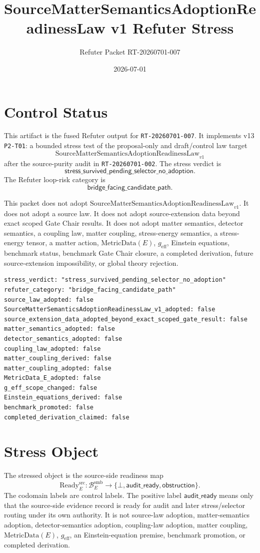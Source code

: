 \documentclass[11pt]{article}
\title{SourceMatterSemanticsAdoptionReadinessLaw v1 Refuter Stress}
\author{Refuter Packet RT-20260701-007}
\date{2026-07-01}
\newcommand{\SMSAR}{\mathrm{SourceMatterSemanticsAdoptionReadinessLaw}_{v1}}
\newcommand{\BridgeDom}{\mathcal B^{\mathrm{smb}}_E}
\newcommand{\Ready}{\mathrm{Ready}^{\mathrm{src}}_E}
\newcommand{\AuditReady}{\mathsf{audit\_ready}}
\newcommand{\Obstruction}{\mathsf{obstruction}}
\newcommand{\Bottom}{\bot}
\newcommand{\MetricData}{\mathrm{MetricData}}
\newcommand{\geff}{g_{\mathrm{eff}}}
\newcommand{\StressVerdict}{\mathsf{stress\_survived\_pending\_selector\_no\_adoption}}
\begin{document}
\maketitle

\section{Control Status}

This artifact is the fused Refuter output for \texttt{RT-20260701-007}. It
implements v13 \texttt{P2-T01}: a bounded stress test of the proposal-only
and draft/control law target
\[
  \SMSAR
\]
after the source-purity audit in \texttt{RT-20260701-002}. The stress verdict
is
\[
  \StressVerdict.
\]
The Refuter loop-risk category is
\[
  \mathsf{bridge\_facing\_candidate\_path}.
\]

This packet does not adopt \(\SMSAR\). It does not adopt a source law. It
does not adopt source-extension data beyond exact scoped Gate Chair results.
It does not adopt matter semantics, detector semantics, a coupling law,
matter coupling, stress-energy semantics, a stress-energy tensor, a matter
action, \(\MetricData(E)\), \(\geff\), Einstein equations, benchmark status,
benchmark Gate Chair closure, a completed derivation, future source-extension
impossibility, or global theory rejection.

\begin{verbatim}
stress_verdict: "stress_survived_pending_selector_no_adoption"
refuter_category: "bridge_facing_candidate_path"
source_law_adopted: false
SourceMatterSemanticsAdoptionReadinessLaw_v1_adopted: false
source_extension_data_adopted_beyond_exact_scoped_gate_result: false
matter_semantics_adopted: false
detector_semantics_adopted: false
coupling_law_adopted: false
matter_coupling_derived: false
matter_coupling_adopted: false
MetricData_E_adopted: false
g_eff_scope_changed: false
Einstein_equations_derived: false
benchmark_promoted: false
completed_derivation_claimed: false
\end{verbatim}

\section{Stress Object}

The stressed object is the source-side readiness map
\[
  \Ready:\BridgeDom\to\{\Bottom,\AuditReady,\Obstruction\}.
\]
The codomain labels are control labels. The positive label
\(\AuditReady\) means only that the source-side evidence record is ready for
audit and later stress/selector routing under its own authority. It is not
source-law adoption, matter-semantics adoption, detector-semantics adoption,
coupling-law adoption, matter coupling, \(\MetricData(E)\), \(\geff\), an
Einstein-equation premise, benchmark promotion, or completed derivation.
\end{document}
